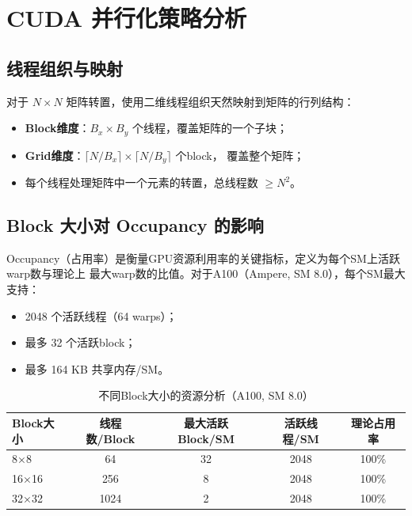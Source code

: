 \documentclass[UTF8,a4paper,12pt,fontset=none]{ctexart}
\begin{document}
\section{CUDA 并行化策略分析}

\subsection{线程组织与映射}

对于 $N \times N$ 矩阵转置，使用二维线程组织天然映射到矩阵的行列结构：

\begin{itemize}
  \item \textbf{Block维度}：$B_x \times B_y$ 个线程，覆盖矩阵的一个子块；
  \item \textbf{Grid维度}：$\lceil N / B_x \rceil \times \lceil N / B_y \rceil$ 个block，
        覆盖整个矩阵；
  \item 每个线程处理矩阵中一个元素的转置，总线程数 $\ge N^2$。
\end{itemize}

\subsection{Block 大小对 Occupancy 的影响}

Occupancy（占用率）是衡量GPU资源利用率的关键指标，定义为每个SM上活跃warp数与理论上
最大warp数的比值。对于A100（Ampere, SM 8.0），每个SM最大支持：

\begin{itemize}
  \item 2048 个活跃线程（64 warps）；
  \item 最多 32 个活跃block；
  \item 最多 164 KB 共享内存/SM。
\end{itemize}

\begin{table}[H]
  \centering
  \caption{不同Block大小的资源分析（A100, SM 8.0）}
  \label{tab:occupancy}
  \begin{tabular}{lcccc}
    \toprule
    Block大小 & 线程数/Block & 最大活跃Block/SM & 活跃线程/SM & 理论占用率 \\
    \midrule
    8×8   & 64   & 32 & 2048 & 100\% \\
    16×16 & 256  & 8  & 2048 & 100\% \\
    32×32 & 1024 & 2  & 2048 & 100\% \\
    \bottomrule
  \end{tabular}
\end{table}
\end{document}
